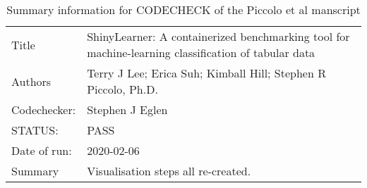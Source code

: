 \begin{table}
  \centering
  \begin{tabular}{lp{}}
    \toprule
    Title & ShinyLearner: A containerized benchmarking tool for machine-learning classification of tabular data\\
    Authors & Terry J Lee; Erica Suh; Kimball Hill; Stephen R Piccolo, Ph.D.\\
    Codechecker: & Stephen J Eglen\\
    STATUS:  & PASS\\
    Date of run: & 2020-02-06\\
    Summary & Visualisation steps all re-created.\\
              \bottomrule
  \end{tabular}
  \caption{Summary information for CODECHECK of the Piccolo et al
    manscript}
  \label{tab:summary}
\end{table}